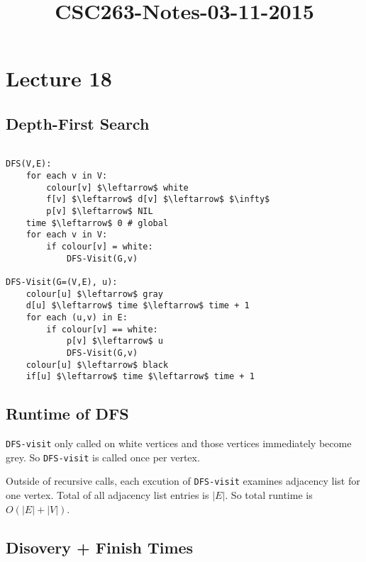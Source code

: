 



\title{CSC263-Notes-03-11-2015}



\section*{Lecture 18}

\subsection*{Depth-First Search}

\begin{lstlisting}[mathescape]

DFS(V,E):
	for each v in V:
		colour[v] $\leftarrow$ white
		f[v] $\leftarrow$ d[v] $\leftarrow$ $\infty$
		p[v] $\leftarrow$ NIL
	time $\leftarrow$ 0 # global
	for each v in V:
		if colour[v] = white:
			DFS-Visit(G,v)

DFS-Visit(G=(V,E), u):
	colour[u] $\leftarrow$ gray
	d[u] $\leftarrow$ time $\leftarrow$ time + 1
	for each (u,v) in E:
		if colour[v] == white:
			p[v] $\leftarrow$ u
			DFS-Visit(G,v)
	colour[u] $\leftarrow$ black
	if[u] $\leftarrow$ time $\leftarrow$ time + 1

\end{lstlisting}

\subsection*{Runtime of DFS}

\noindent \texttt{DFS-visit} only called on white vertices and those vertices immediately become grey. So \texttt{DFS-visit} is called once per vertex.

\noindent Outside of recursive calls, each excution of \texttt{DFS-visit} examines adjacency list for one vertex. Total
of all adjacency list entries is $|E|$. So total runtime is $O(|E| + |V|)$.

\subsection*{Disovery + Finish Times}


